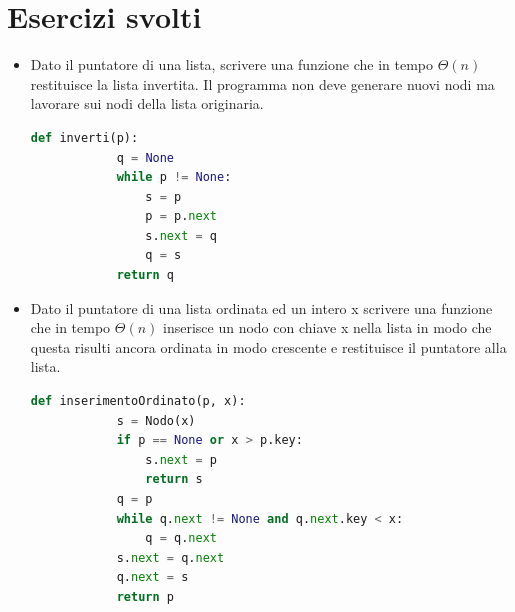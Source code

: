 \chapter*{Esercizi svolti}
\begin{exercise}[Liste]\phantom{}
\begin{itemize}
    \item Dato il puntatore di una lista, scrivere una funzione che in tempo $\Theta(n)$ restituisce la lista invertita. Il programma non deve generare nuovi nodi ma lavorare sui nodi della lista originaria.
    \begin{lstlisting}[language=Python]
        def inverti(p):
            q = None
            while p != None:
                s = p
                p = p.next
                s.next = q
                q = s
            return q
    \end{lstlisting}
    
    \item Dato il puntatore di una lista ordinata ed un intero x scrivere una funzione che in tempo $\Theta(n)$ inserisce un nodo con chiave x nella lista in modo che questa risulti ancora ordinata in modo crescente e restituisce il puntatore alla lista.
    \begin{lstlisting}[language=Python]
        def inserimentoOrdinato(p, x):
            s = Nodo(x)
            if p == None or x > p.key:
                s.next = p
                return s
            q = p
            while q.next != None and q.next.key < x:
                q = q.next
            s.next = q.next
            q.next = s
            return p
    \end{lstlisting}
    
\end{itemize}
    
    
    

    
\end{exercise}